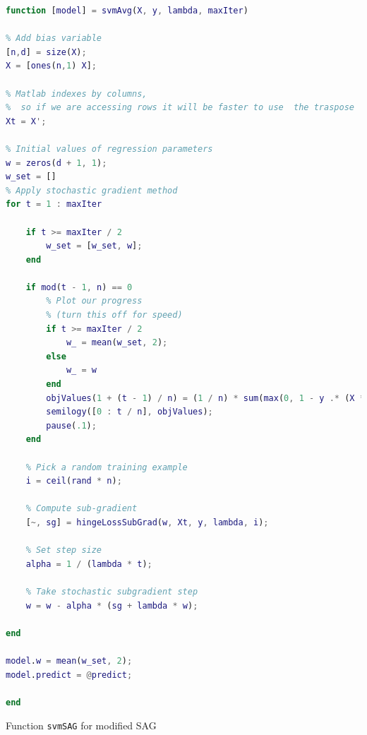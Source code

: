 \documentclass[10pt]{article}
\begin{document}
\begin{lstlisting}[language=MATLAB]
function [model] = svmAvg(X, y, lambda, maxIter)

% Add bias variable
[n,d] = size(X);
X = [ones(n,1) X];

% Matlab indexes by columns,
%  so if we are accessing rows it will be faster to use  the traspose
Xt = X';

% Initial values of regression parameters
w = zeros(d + 1, 1);
w_set = []
% Apply stochastic gradient method
for t = 1 : maxIter

    if t >= maxIter / 2
        w_set = [w_set, w];
    end

    if mod(t - 1, n) == 0
        % Plot our progress
        % (turn this off for speed)
        if t >= maxIter / 2
            w_ = mean(w_set, 2);
        else
            w_ = w
        end
        objValues(1 + (t - 1) / n) = (1 / n) * sum(max(0, 1 - y .* (X * w_))) + (lambda / 2) * (w_' * w_);
        semilogy([0 : t / n], objValues);
        pause(.1);
    end
    
    % Pick a random training example
    i = ceil(rand * n);
    
    % Compute sub-gradient
    [~, sg] = hingeLossSubGrad(w, Xt, y, lambda, i);
    
    % Set step size
    alpha = 1 / (lambda * t);
    
    % Take stochastic subgradient step
    w = w - alpha * (sg + lambda * w);
    
end

model.w = mean(w_set, 2);
model.predict = @predict;

end
\end{lstlisting}
\clearpage
Function \texttt{svmSAG} for modified SAG
\end{document}
